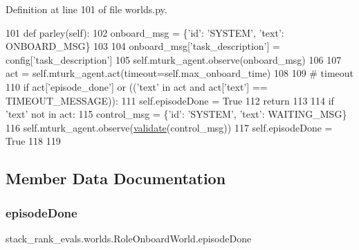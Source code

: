 Definition at line 101 of file worlds.\+py.


\begin{DoxyCode}
101     \textcolor{keyword}{def }parley(self):
102         onboard\_msg = \{\textcolor{stringliteral}{'id'}: \textcolor{stringliteral}{'SYSTEM'}, \textcolor{stringliteral}{'text'}: ONBOARD\_MSG\}
103 
104         onboard\_msg[\textcolor{stringliteral}{'task\_description'}] = config[\textcolor{stringliteral}{'task\_description'}]
105         self.mturk\_agent.observe(onboard\_msg)
106 
107         act = self.mturk\_agent.act(timeout=self.max\_onboard\_time)
108 
109         \textcolor{comment}{# timeout}
110         \textcolor{keywordflow}{if} act[\textcolor{stringliteral}{'episode\_done'}] \textcolor{keywordflow}{or} ((\textcolor{stringliteral}{'text'} \textcolor{keywordflow}{in} act \textcolor{keywordflow}{and} act[\textcolor{stringliteral}{'text'}] == TIMEOUT\_MESSAGE)):
111             self.episodeDone = \textcolor{keyword}{True}
112             \textcolor{keywordflow}{return}
113 
114         \textcolor{keywordflow}{if} \textcolor{stringliteral}{'text'} \textcolor{keywordflow}{not} \textcolor{keywordflow}{in} act:
115             control\_msg = \{\textcolor{stringliteral}{'id'}: \textcolor{stringliteral}{'SYSTEM'}, \textcolor{stringliteral}{'text'}: WAITING\_MSG\}
116             self.mturk\_agent.observe(\hyperlink{namespaceparlai_1_1core_1_1worlds_afc3fad603b7bce41dbdc9cdc04a9c794}{validate}(control\_msg))
117             self.episodeDone = \textcolor{keyword}{True}
118 
119 
\end{DoxyCode}


\subsection{Member Data Documentation}
\mbox{\label{classstack__rank__evals_1_1worlds_1_1RoleOnboardWorld_a80faeeeacacbf4babca6b7a66d6716bd}} 
\subsubsection{\texorpdfstring{episode\+Done}{episodeDone}}
{\footnotesize\ttfamily stack\+\_\+rank\+\_\+evals.\+worlds.\+Role\+Onboard\+World.\+episode\+Done}



